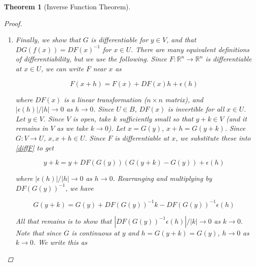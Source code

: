 \documentclass{article}
\newtheorem{theorem}{Theorem}[section]
\def\R{{\mathbb R}}
\begin{document}
\begin{theorem}[Inverse Function Theorem]
\begin{proof}
\begin{enumerate}
Rearrange to get 

\begin{align*}
\frac{1}{2}|x_1 - x_2| &\leq |J_0^{-1} (F(x_1) - F(x_2))| \\
|x_1 - x_2| &\leq 2 |||J_0^{-1}|| \: |F(x_1) - F(x_2)|
\end{align*}

Substituting in $x_1 = G(y_1), x_2 = G(y_2)$ and noting that $G$ is the inverse of $F$, this becomes

\begin{align}\label{Glip}
|G(y_1) - G(y_2)| &\leq 2 |||J_0^{-1}|| \: |y_1 - y_2|
\end{align}

This implies $G$ is Lipschitz, thus continuous.

\item Finally, we show that $G$ is differentiable for $y \in V$, and that $DG(f(x)) = DF(x)^{-1}$ for $x \in U$. There are many equivalent definitions of differentiability, but we use the following. Since $F: \R^n \rightarrow \R^n$ is differentiable at $x \in U$, we can write $F$ near $x$ as

\begin{equation}\label{diffF}
F(x + h) = F(x) + DF(x)h + \epsilon(h)
\end{equation}

where $DF(x)$ is a linear transformation ($n \times n$ matrix), and $|\epsilon(h)|/|h| \rightarrow 0$ as $h \rightarrow 0$. Since $U \in B$, $DF(x)$ is invertible for all $x \in U$. \\

Let $y \in V$. Since $V$ is open, take $k$ sufficiently small so that $y + k \in V$ (and it remains in $V$ as we take $k \rightarrow 0$). Let $x = G(y)$, $x + h = G(y + k)$. Since $G: V \rightarrow U$, $x, x+h \in U$. Since $F$ is differentiable at $x$, we substitute these into \eqref{diffF} to get

\[
y + k = y + DF(G(y))(G(y + k) - G(y)) + \epsilon(h)
\]

where $|\epsilon(h)|/|h| \rightarrow 0$ as $h \rightarrow 0$. Rearranging and multiplying by $DF(G(y))^{-1}$, we have

\[
G(y + k) = G(y) + DF(G(y))^{-1}k - DF(G(y))^{-1}\epsilon(h)
\]

All that remains is to show that $|DF(G(y))^{-1}\epsilon(h)|/|k| \rightarrow 0$ as $k \rightarrow 0$. Note that since $G$ is continuous at $y$ and $h = G(y + k) = G(y)$, $h \rightarrow 0$ as $k \rightarrow 0$. We write this as
 

\end{enumerate}
\end{proof}
\end{theorem}
\end{document}
